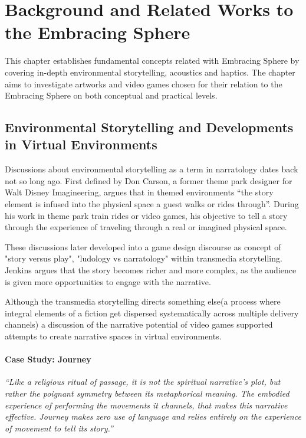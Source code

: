 \chapter{Background and Related Works to the Embracing Sphere}
    This chapter establishes fundamental concepts related with Embracing Sphere by covering in-depth environmental storytelling, acoustics and haptics. The chapter aims to investigate artworks and video games chosen for their relation to the Embracing Sphere on both conceptual and practical levels.\par
    \section{Environmental Storytelling and Developments in Virtual Environments}
        Discussions about environmental storytelling as a term in narratology dates back not so long ago. First defined by Don Carson, a former theme park designer for Walt Disney Imagineering, argues that in themed environments “the story element is infused into the physical space a guest walks or rides through”\cite{Liminal_Space_Between_Embedded_and_Emergent_Narrative}. During his work in theme park train rides or video games, his objective to tell a story through the experience of traveling through a real or imagined physical space\cite{Lessons_Learned_from_the_Theme_Park_Industry}.\par

        These discussions later developed into a game design discourse as concept of "story versus play", "ludology vs narratology\cite{Hamlet_on_the_Holodeck}" within transmedia storytelling\cite{Jenkins_Shall_We_Play}. Jenkins argues that the story becomes richer and more complex, as the audience is given more opportunities to engage with the narrative.\par

        Although the transmedia storytelling directs something else(a process where integral elements of a fiction get dispersed systematically across multiple delivery channels\cite{Jenkins_Transmedia}) a discussion of the narrative potential of video games supported attempts to create narrative spaces in virtual environments\cite{Liminal_Space_Between_Embedded_and_Emergent_Narrative}.\par

        \subsubsection{Case Study: Journey}
            \emph{“Like a religious ritual of passage, it is not the spiritual narrative’s plot, but rather the poignant symmetry between its metaphorical meaning. The embodied experience of performing the movements it channels, that makes this narrative effective. Journey makes zero use of language and relies entirely on the experience of movement to tell its story\cite{Game_Movement_as_Enactive_Focalization}\cite{Narrative_Geography}.”}\par

